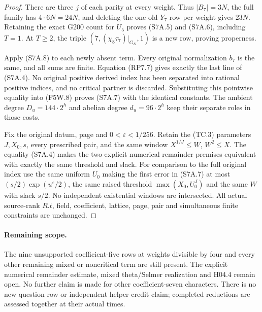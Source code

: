 \begin{proof}
There are three $j$ of each parity at every weight.
Thus $|B_7|=3N$, the full family has $4\cdot6N=24N$,
and deleting the one old $Y_7$ row per weight gives $23N$.
Retaining the exact G200 count for $U_5$ proves (S7A.5) and
(S7A.6), including $T=1$. At $T\geq2$, the triple
$(7,(\chi_8\tau_7)|_{G_K},1)$ is a new row, proving properness.

Apply (S7A.8) to each newly absent term. Every original
normalization $b_7$ is the same, and all sums are finite.
Equation (RP7.7) gives exactly the last line of (S7A.4).
No original positive derived index has been separated into
rational positive indices, and no critical partner is discarded.
Substituting this pointwise equality into (F5W.8) proves
(S7A.7) with the identical constants.
The ambient degree $D_u=144\cdot2^h$ and abelian degree
$d_u=96\cdot2^h$ keep their separate roles in those costs.

Fix the original datum, page and $0<\varepsilon<1/256$.
Retain the (TC.3) parameters $J,X_0,s$, every prescribed pair,
and the same window $X^{1/J}\leq W$, $W^2\leq X$.
The equality (S7A.4) makes the two explicit numerical remainder
premises equivalent with exactly the same threshold and slack.
For comparison to the full original index use the same uniform
$U_0$ making the first error in (S7A.7) at most
$(s/2)\exp(u^\varepsilon/2)$, the same raised threshold
$\max(X_0,U_0^J)$ and the same $W$ with slack $s/2$.
No independent existential windows are intersected.
All actual source-rank $R.t$, field, coefficient, lattice,
page, pair and simultaneous finite constraints are unchanged.
\end{proof}

\paragraph{Remaining scope.}
The nine unsupported coefficient-five rows at weights divisible
by four and every other remaining mixed or noncritical term are
still present. The explicit numerical remainder estimate,
mixed theta/Selmer realization and H04.4 remain open.
No further claim is made for other coefficient-seven characters.
There is no new question row or independent helper-credit claim;
completed reductions are assessed together at their actual times.
